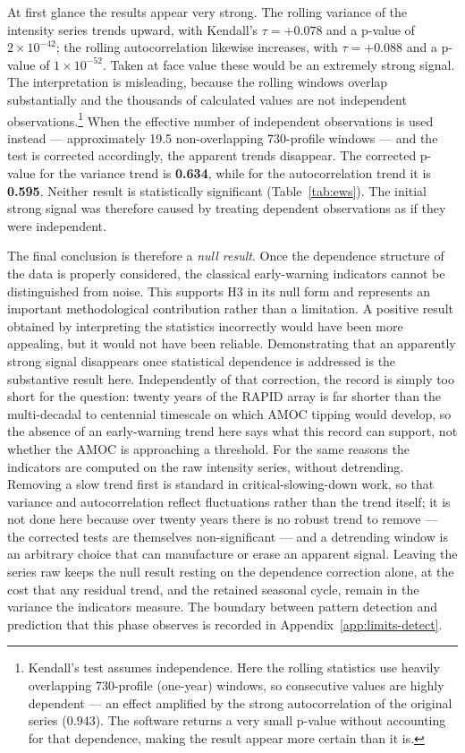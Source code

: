 At first glance the results appear very strong. The rolling variance of the intensity series trends upward, with Kendall's $\tau = +0.078$ and a p-value of $2\times10^{-42}$; the rolling autocorrelation likewise increases, with $\tau = +0.088$ and a p-value of $1\times10^{-52}$. Taken at face value these would be an extremely strong signal. The interpretation is misleading, because the rolling windows overlap substantially and the thousands of calculated values are not independent observations.\footnote{Kendall's test assumes independence. Here the rolling statistics use heavily overlapping 730-profile (one-year) windows, so consecutive values are highly dependent --- an effect amplified by the strong autocorrelation of the original series ($0.943$). The software returns a very small p-value without accounting for that dependence, making the result appear more certain than it is.} When the effective number of independent observations is used instead --- approximately 19.5 non-overlapping 730-profile windows --- and the test is corrected accordingly, the apparent trends disappear. The corrected p-value for the variance trend is \textbf{0.634}, while for the autocorrelation trend it is \textbf{0.595}. Neither result is statistically significant (Table~\ref{tab:ews}). The initial strong signal was therefore caused by treating dependent observations as if they were independent.




The final conclusion is therefore a \emph{null result}. Once the dependence structure of the data is properly considered, the classical early-warning indicators cannot be distinguished from noise. This supports H3 in its null form and represents an important methodological contribution rather than a limitation. A positive result obtained by interpreting the statistics incorrectly would have been more appealing, but it would not have been reliable. Demonstrating that an apparently strong signal disappears once statistical dependence is addressed is the substantive result here. Independently of that correction, the record is simply too short for the question: twenty years of the RAPID array is far shorter than the multi-decadal to centennial timescale on which AMOC tipping would develop, so the absence of an early-warning trend here says what this record can support, not whether the AMOC is approaching a threshold. For the same reasons the indicators are computed on the raw intensity series, without detrending. Removing a slow trend first is standard in critical-slowing-down work, so that variance and autocorrelation reflect fluctuations rather than the trend itself; it is not done here because over twenty years there is no robust trend to remove --- the corrected tests are themselves non-significant --- and a detrending window is an arbitrary choice that can manufacture or erase an apparent signal. Leaving the series raw keeps the null result resting on the dependence correction alone, at the cost that any residual trend, and the retained seasonal cycle, remain in the variance the indicators measure. The boundary between pattern detection and prediction that this phase observes is recorded in Appendix~\ref{app:limits-detect}.

